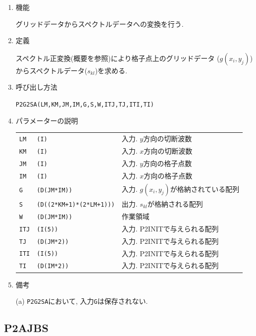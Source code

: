 \documentclass[a4j,fleqn]{jarticle}
\begin{document}
\begin{enumerate}

\item 機能 

グリッドデータからスペクトルデータへの変換を行う.

\item 定義

スペクトル正変換(概要を参照)により格子点上のグリッドデータ
($g(x_i,y_j)$)からスペクトルデータ($s_{kl}$)を求める.

\item 呼び出し方法 

{\tt P2G2SA(LM,KM,JM,IM,G,S,W,ITJ,TJ,ITI,TI)}
  
\item パラメーターの説明

\begin{tabular}{lll}
{\tt LM} & {\tt (I)} & 入力. $y$方向の切断波数\\
{\tt KM} & {\tt (I)} & 入力. $x$方向の切断波数\\
{\tt JM} & {\tt (I)} & 入力. $y$方向の格子点数\\
{\tt IM} & {\tt (I)} & 入力. $x$方向の格子点数\\
{\tt G} & {\tt (D(JM*IM))} & 入力. $g(x_i,y_j)$が格納されている配列\\
{\tt S} & {\tt (D((2*KM+1)*(2*LM+1)))} & 出力. $s_{kl}$が格納される配列\\
{\tt W} & {\tt (D(JM*IM))} & 作業領域\\
{\tt ITJ} & {\tt (I(5))} & 入力. P2INITで与えられる配列\\
{\tt TJ} & {\tt (D(JM*2))} & 入力. P2INITで与えられる配列\\
{\tt ITI} & {\tt (I(5))} & 入力. P2INITで与えられる配列\\
{\tt TI} & {\tt (D(IM*2))} & 入力. P2INITで与えられる配列
\end{tabular}

\item 備考

(a) {\tt P2G2SA}において, 入力{\tt G}は保存されない.

\end{enumerate}


\subsection{P2AJBS}
\end{document}
